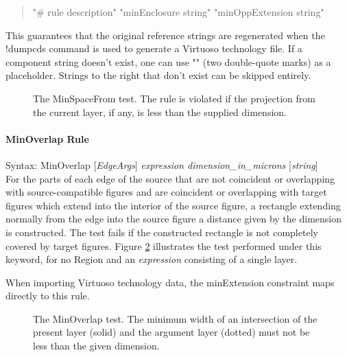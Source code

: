 \begin{description}
\begin{quote}\vt
"\# rule description" "minEnclosure string" "minOppExtension string"
\end{quote}

This guarantees that the original reference strings are regenerated
when the {\cb !dumpcds} command is used to generate a Virtuoso
technology file.  If a component string doesn't exist, one can use
{\vt ""} (two double-quote marks) as a placeholder.  Strings to the
right that don't exist can be skipped entirely.
\end{description}

\begin{figure}
\caption{\label{drcminspacefrom} The {\et MinSpaceFrom} test.  The rule
is violated if the projection from the current layer, if any, is less
than the supplied dimension.}
\vspace{1.5ex}
\begin{center}
\end{center}
\end{figure}

\paragraph{{\et  MinOverlap} Rule}

\begin{description}
\item{Syntax: {\vt MinOverlap} [{\it EdgeArgs\/}]
    {\it expression dimension\_in\_microns} [{\it string\/}] }\\

For the parts of each edge of the source that are not coincident or
overlapping with source-compatible figures and are coincident or
overlapping with target figures which extend into the interior of the
source figure, a rectangle extending normally from the edge into the
source figure a distance given by the dimension is constructed.  The
test fails if the constructed rectangle is not completely covered by
target figures.  Figure \ref{drcminoverlap} illustrates the test
performed under this keyword, for no {\et Region} and an {\it
expression} consisting of a single layer.

When importing Virtuoso technology data, the {\vt minExtension}
constraint maps directly to this rule.
\end{description}

\begin{figure}
\caption{\label{drcminoverlap} The {\et MinOverlap} test.  The minimum
width of an intersection of the present layer (solid) and the argument
layer (dotted) must not be less than the given dimension.}
\vspace{1.5ex}
\begin{center}
\end{center}
\end{figure}

